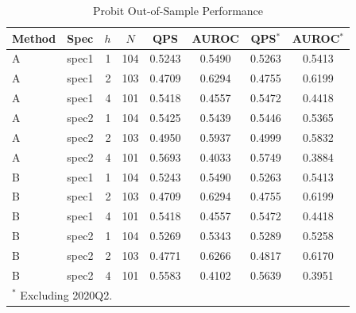 \begin{table}[htbp]
\centering
\caption{Probit Out-of-Sample Performance}
\label{tab:probit}
\footnotesize
\begin{tabular}{llrccccc}
\toprule
Method & Spec & $h$ & $N$ & QPS & AUROC & QPS$^*$ & AUROC$^*$ \\
\midrule
  A & spec1 & 1 & 104 & 0.5243 & 0.5490 & 0.5263 & 0.5413 \\
  A & spec1 & 2 & 103 & 0.4709 & 0.6294 & 0.4755 & 0.6199 \\
  A & spec1 & 4 & 101 & 0.5418 & 0.4557 & 0.5472 & 0.4418 \\
  A & spec2 & 1 & 104 & 0.5425 & 0.5439 & 0.5446 & 0.5365 \\
  A & spec2 & 2 & 103 & 0.4950 & 0.5937 & 0.4999 & 0.5832 \\
  A & spec2 & 4 & 101 & 0.5693 & 0.4033 & 0.5749 & 0.3884 \\
  B & spec1 & 1 & 104 & 0.5243 & 0.5490 & 0.5263 & 0.5413 \\
  B & spec1 & 2 & 103 & 0.4709 & 0.6294 & 0.4755 & 0.6199 \\
  B & spec1 & 4 & 101 & 0.5418 & 0.4557 & 0.5472 & 0.4418 \\
  B & spec2 & 1 & 104 & 0.5269 & 0.5343 & 0.5289 & 0.5258 \\
  B & spec2 & 2 & 103 & 0.4771 & 0.6266 & 0.4817 & 0.6170 \\
  B & spec2 & 4 & 101 & 0.5583 & 0.4102 & 0.5639 & 0.3951 \\
\bottomrule
\multicolumn{8}{l}{\footnotesize $^*$ Excluding 2020Q2.} \\
\end{tabular}
\end{table}
